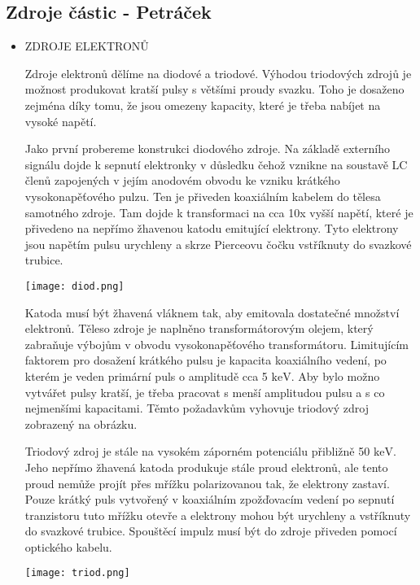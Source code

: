 \documentclass[../../main.tex]{subfiles}
\begin{document}
\subsection{Zdroje částic - Petráček}
\begin{itemize}
	
	\item ZDROJE ELEKTRONŮ
	
	Zdroje elektronů dělíme na diodové a triodové. Výhodou triodových zdrojů je možnost produkovat kratší pulsy s většími proudy svazku. Toho je dosaženo zejména díky tomu, že jsou omezeny kapacity, které je třeba nabíjet na vysoké napětí.
	
	Jako první probereme konstrukci diodového zdroje. Na základě externího signálu dojde k sepnutí elektronky v důsledku čehož vznikne na soustavě LC členů zapojených v jejím anodovém obvodu ke vzniku krátkého vysokonapěťového pulzu. Ten je přiveden koaxiálním kabelem do tělesa samotného zdroje. Tam dojde k transformaci na cca 10x vyšší napětí, které je přivedeno na nepřímo žhavenou katodu emitující elektrony. Tyto elektrony jsou napětím pulsu urychleny a skrze Pierceovu čočku vstříknuty do svazkové trubice.
	
	 \begin{center}
		\texttt{[image: diod.png]}
	\end{center} 
	
	Katoda musí být žhavená vláknem tak, aby emitovala dostatečné množství elektronů. Těleso zdroje je naplněno transformátorovým olejem, který zabraňuje výbojům v obvodu vysokonapěťového transformátoru. Limitujícím faktorem pro dosažení krátkého pulsu je kapacita koaxiálního vedení, po kterém je veden primární puls o amplitudě cca 5 $\mathrm{keV}$. Aby bylo možno vytvářet pulsy kratší, je třeba pracovat s menší amplitudou pulsu a s co nejmenšími kapacitami. Těmto požadavkům vyhovuje triodový zdroj zobrazený na obrázku. 
	
	Triodový zdroj je stále na vysokém záporném potenciálu přibližně 50 $\mathrm{keV}$. Jeho nepřímo žhavená katoda produkuje stále proud elektronů, ale tento proud nemůže projít přes mřížku polarizovanou tak, že elektrony zastaví. Pouze krátký puls vytvořený v koaxiálním zpožďovacím vedení po sepnutí tranzistoru tuto mřížku otevře a elektrony mohou být urychleny a vstříknuty do svazkové trubice. Spouštěcí impulz musí být do zdroje přiveden pomocí optického kabelu. 
	
	
	\begin{center}
		\texttt{[image: triod.png]}
	\end{center}
	

\end{itemize}
\end{document}
